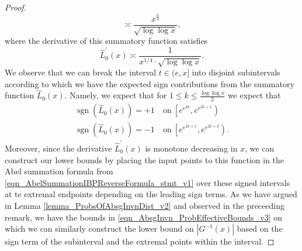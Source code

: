 \documentclass[11pt,reqno,a4letter]{article}
\numberwithin{figure}{section}
\numberwithin{table}{section}
\theoremstyle{plain}
\numberwithin{theorem}{section}
\theoremstyle{definition}
\begin{document}
\begin{proof}
\[     \asymp \frac{x^{\frac{3}{4}}}{\sqrt{\log\log x}}, 
\]
where the derivative of this summatory function satisfies 
\[
\widehat{L}_0^{\prime}(x) \asymp \frac{1}{x^{1/4} \cdot \sqrt{\log\log x}}. 
\]
We observe that we can break the interval $t \in (e, x]$ into disjoint subintervals 
according to which we have the expected sign contributions from the 
summatory function $\widehat{L}_0(x)$. Namely, we expect that 
for $1 \leq k \leq \frac{\log\log x}{2}$ we expect that 
\begin{align*} 
\operatorname{sgn}\left(\widehat{L}_0(x)\right) = +1 & \mathrm{\ on\ } 
     \left[e^{e^{2k}}, e^{e^{2k+1}}\right) \\ 
\operatorname{sgn}\left(\widehat{L}_0(x)\right) = -1 & \mathrm{\ on\ } 
     \left[e^{e^{2k+1}}, e^{e^{2k+2}}\right). 
\end{align*} 
Moreover, since the derivative $\widehat{L}_0^{\prime}(x)$ is monotone decreasing in $x$, 
we can construct our lower bounds by placing the input points to this function 
in the Abel summation formula from 
\eqref{eqn_AbelSummationIBPReverseFormula_stmt_v1} 
over these signed intervals at te extremal endpoints depending on the leading sign terms. 
As we have argued in Lemma \ref{lemma_ProbsOfAbsgInvnDist_v2} and 
observed in the preceeding remark, we have the bounds in 
\eqref{eqn_AbsgInvn_ProbEffectiveBounds_v3} on which 
we can similarly construct the lower bound on $|G^{-1}(x)|$ based on the 
sign term of the subinterval and the extremal points within the interval. 


\end{proof}
\end{document}
